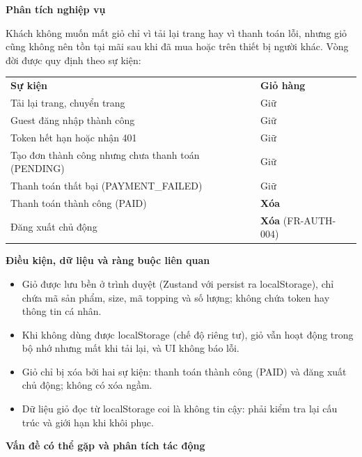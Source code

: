 \documentclass[11pt,a4paper,oneside]{report}
\begin{document}
\textbf{Phân tích nghiệp vụ}

Khách không muốn mất giỏ chỉ vì tải lại trang hay vì thanh toán lỗi, nhưng giỏ cũng không nên tồn tại mãi sau khi đã mua hoặc trên thiết bị người khác. Vòng đời được quy định theo sự kiện:

\begin{longtable}[]{@{}
  >{\raggedright\arraybackslash}p{}
  >{\raggedright\arraybackslash}p{}@{}}
\toprule\noalign{}
\endhead
\bottomrule\noalign{}
\endlastfoot
\textbf{Sự kiện} & \textbf{Giỏ hàng} \\
Tải lại trang, chuyển trang & Giữ \\
Guest đăng nhập thành công & Giữ \\
Token hết hạn hoặc nhận 401 & Giữ \\
Tạo đơn thành công nhưng chưa thanh toán (PENDING) & Giữ \\
Thanh toán thất bại (PAYMENT\_FAILED) & Giữ \\
Thanh toán thành công (PAID) & \textbf{Xóa} \\
Đăng xuất chủ động & \textbf{Xóa} (FR-AUTH-004) \\
\end{longtable}

\textbf{Điều kiện, dữ liệu và ràng buộc liên quan}

\begin{itemize}
\item
  Giỏ được lưu bền ở trình duyệt (Zustand với persist ra localStorage), chỉ chứa mã sản phẩm, size, mã topping và số lượng; không chứa token hay thông tin cá nhân.
\item
  Khi không dùng được localStorage (chế độ riêng tư), giỏ vẫn hoạt động trong bộ nhớ nhưng mất khi tải lại, và UI không báo lỗi.
\item
  Giỏ chỉ bị xóa bởi hai sự kiện: thanh toán thành công (PAID) và đăng xuất chủ động; không có xóa ngầm.
\item
  Dữ liệu giỏ đọc từ localStorage coi là không tin cậy: phải kiểm tra lại cấu trúc và giới hạn khi khôi phục.
\end{itemize}

\textbf{Vấn đề có thể gặp và phân tích tác động}
\end{document}
